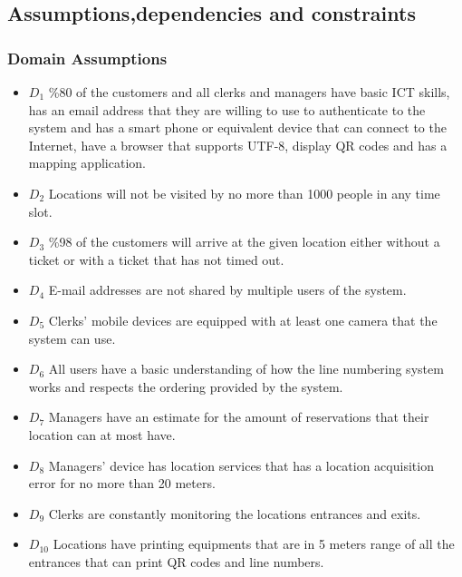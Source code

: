 

\subsection{Assumptions,dependencies and constraints}
\subsubsection{Domain Assumptions}

\begin{itemize}
    \item \textbf{$D_1$} \%80 of the customers and all clerks and managers have basic ICT skills, has an email address that they are willing to use to authenticate to the system and has a smart phone or equivalent device that can connect to the Internet, have a browser that supports UTF-8, display QR codes and has a mapping application. %
    \item \textbf{$D_2$} Locations will not be visited by no more than 1000 people in any time slot. %
    \item \textbf{$D_3$} \%98 of the customers will arrive at the given location either without a ticket or with a ticket that has not timed out. %
    \item \textbf{$D_4$} E-mail addresses are not shared by multiple users of the system. %
    \item \textbf{$D_5$} Clerks' mobile devices are equipped with at least one camera that the system can use. %
    \item \textbf{$D_6$} All users have a basic understanding of how the line numbering system works and respects the ordering provided by the system. %
    \item \textbf{$D_7$} Managers have an estimate for the amount of reservations that their location can at most have. %
    \item \textbf{$D_8$} Managers' device has location services that has a location acquisition error for no more than 20 meters. %
    \item \textbf{$D_9$} Clerks are constantly monitoring the locations entrances and exits. %
    \item \textbf{$D_{10}$} Locations have printing equipments that are in 5 meters range of all the entrances that can print QR codes and line numbers. %

\end{itemize}
